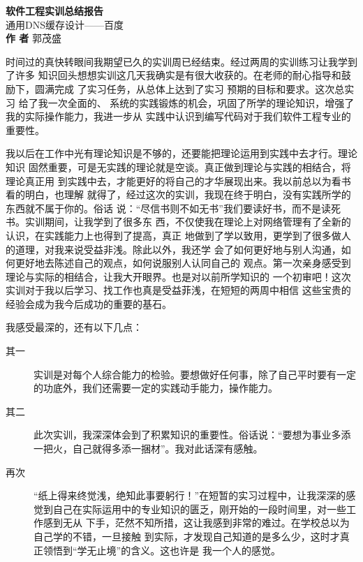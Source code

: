 \documentclass[12pt, a4paper, titlepage]{article}
\begin{document}
\begin{titlepage}
\centering
\Huge\textbf{软件工程实训总结报告}\\[7pt]
\large{通用DNS缓存设计——百度}\\[50mm]

\textbf{作 \qquad 者} {  郭茂盛}

\end{titlepage}

\newpage
{}
\par{
	时间过的真快转眼间我期望已久的实训周已经结束。经过两周的实训练习让我学到了许多
	知识回头想想实训这几天我确实是有很大收获的。在老师的耐心指导和鼓励下，圆满完成
	了实习任务，从总体上达到了实习 预期的目标和要求。这次总实习 给了我一次全面的、
	系统的实践锻炼的机会，巩固了所学的理论知识，增强了我的实际操作能力，我进一步从
	实践中认识到编写代码对于我们软件工程专业的重要性。	
}

\par{
	我以后在工作中光有理论知识是不够的，还要能把理论运用到实践中去才行。理论知识
	固然重要，可是无实践的理论就是空谈。真正做到理论与实践的相结合，将理论真正用
	到实践中去，才能更好的将自己的才华展现出来。我以前总以为看书看的明白，也理解
	就得了，经过这次的实训，我现在终于明白，没有实践所学的东西就不属于你的。俗话
	说：“尽信书则不如无书”我们要读好书，而不是读死书。实训期间，让我学到了很多东
	西，不仅使我在理论上对网络管理有了全新的认识，在实践能力上也得到了提高，真正
	地做到了学以致用，更学到了很多做人的道理，对我来说受益非浅。除此以外，我还学
	会了如何更好地与别人沟通，如何更好地去陈述自己的观点，如何说服别人认同自己的
	观点。第一次亲身感受到理论与实际的相结合，让我大开眼界。也是对以前所学知识的
	一个初审吧！这次实训对于我以后学习、找工作也真是受益菲浅，在短短的两周中相信
	这些宝贵的经验会成为我今后成功的重要的基石。	
}

\par{
	我感受最深的，还有以下几点：
}
\begin{description}
	\item[其一]实训是对每个人综合能力的检验。要想做好任何事，除了自己平时要有一定
	的功底外，我们还需要一定的实践动手能力，操作能力。
	\item[其二]此次实训，我深深体会到了积累知识的重要性。俗话说：“要想为事业多添
	一把火，自己就得多添一捆材”。我对此话深有感触。
	\item[再次]“纸上得来终觉浅，绝知此事要躬行！”在短暂的实习过程中，让我深深的感
	觉到自己在实际运用中的专业知识的匮乏，刚开始的一段时间里，对一些工作感到无从
	下手，茫然不知所措，这让我感到非常的难过。在学校总以为自己学的不错，一旦接触
	到实际，才发现自己知道的是多么少，这时才真正领悟到“学无止境”的含义。这也许是
	我一个人的感觉。
\end{description}
\end{document}
